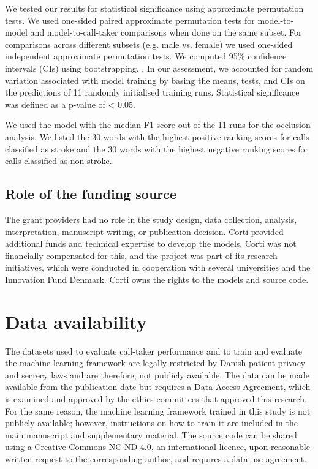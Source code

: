 {We tested our results for statistical significance using approximate permutation tests. We used one-sided paired approximate permutation tests for model-to-model and model-to-call-taker comparisons when done on the same subset. For comparisons across different subsets (e.g. male vs. female) we used one-sided independent approximate permutation tests. We computed 95\% confidence intervals (CIs) using bootstrapping. \cite{dwass_modified_1957,eden_validity_1933}. In our assessment, we accounted for random variation associated with model training by basing the means, tests, and CIs on the predictions of 11 randomly initialised training runs. Statistical significance was defined as a p-value of < 0.05.

We used the model with the median F1-score out of the 11 runs for the occlusion analysis. We listed the 30 words with the highest positive ranking scores for calls classified as stroke and the 30 words with the highest negative ranking scores for calls classified as non-stroke.


\subsection{Role of the funding source}

The grant providers had no role in the study design, data collection, analysis, interpretation, manuscript writing, or publication decision. Corti provided additional funds and technical expertise to develop the models. Corti was not financially compensated for this, and the project was part of its research initiatives, which were conducted in cooperation with several universities and the Innovation Fund Denmark. Corti owns the rights to the models and source code.


\section{Data availability}

The datasets used to evaluate call-taker performance and to train and evaluate the machine learning framework are legally restricted by Danish patient privacy and secrecy laws and are therefore, not publicly available. The data can be made available from the publication date but requires a Data Access Agreement, which is examined and approved by the ethics committees that approved this research. For the same reason, the machine learning framework trained in this study is not publicly available; however, instructions on how to train it are included in the main manuscript and supplementary material. The source code can be shared using a Creative Commons NC-ND 4.0, an international licence, upon reasonable written request to the corresponding author, and requires a data use agreement.


}
